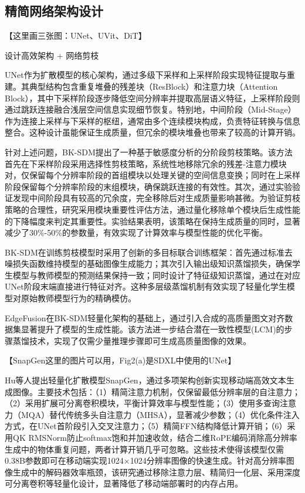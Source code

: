\documentclass[11pt,a4paper,UTF8]{ctexart}
\begin{document}
\subsection{精简网络架构设计}

【这里画三张图：UNet、UVit、DiT】

设计高效架构 + 网络剪枝\cite{li2023snapfusion,kim2023architectural,zhao2024mobilediffusion}

UNet作为扩散模型的核心架构，通过多级下采样和上采样阶段实现特征提取与重建。其典型结构包含重复堆叠的残差块（ResBlock）和注意力块（Attention Block），其中下采样阶段逐步降低空间分辨率并提取高层语义特征，上采样阶段则通过跳跃连接融合浅层空间信息实现细节恢复。特别地，中间阶段（Mid-Stage）作为连接上采样与下采样的枢纽，通常由多个连续模块构成，负责特征转换与信息整合。这种设计虽能保证生成质量，但冗余的模块堆叠也带来了较高的计算开销。

针对上述问题，BK-SDM\cite{kim2023bk}提出了一种基于敏感度分析的分阶段剪枝策略。该方法首先在下采样阶段采用选择性剪枝策略，系统性地移除冗余的残差-注意力模块对，仅保留每个分辨率阶段的首组模块以处理关键的空间信息变换；同时在上采样阶段保留每个分辨率阶段的末组模块，确保跳跃连接的有效性。其次，通过实验验证发现中间阶段具有较高的冗余度，完全移除后对生成质量影响甚微。为验证剪枝策略的合理性，研究采用模块重要性评估方法，通过量化移除单个模块后生成性能的下降幅度来判定其重要性。实验结果表明，该策略在保持生成质量的同时，显著减少了30\%-50\%的参数量，有效实现了计算效率与模型性能的优化平衡。

BK-SDM\cite{kim2023bk}在训练剪枝模型时采用了创新的多目标联合训练框架：首先通过标准去噪损失函数维持模型的基础图像生成能力；其次引入输出级知识蒸馏损失，确保学生模型与教师模型的预测结果保持一致；同时设计了特征级知识蒸馏，通过在对应UNet阶段末端直接进行特征对齐。这种多层级蒸馏机制有效实现了轻量化学生模型对原始教师模型行为的精确模仿。

EdgeFusion\cite{castells2024edgefusion}在BK-SDM轻量化架构的基础上，通过引入合成的高质量图文对齐数据集显著提升了模型的生成性能。该方法进一步结合潜在一致性模型(LCM)的步骤蒸馏技术，实现了仅需少量推理步骤即可生成高质量图像的效果。

【SnapGen这里的图片可以用，Fig2(a)是SDXL中使用的UNet】

Hu等人\cite{hu2024snapgen}提出轻量化扩散模型SnapGen，通过多项架构创新实现移动端高效文本生成图像。主要技术包括：（1）精简注意力机制，仅保留最低分辨率层的自注意力；（2）采用扩展可分离卷积\cite{howard2017mobilenets}模块，平衡计算效率与模型性能；（3）使用多查询注意力（MQA）\cite{shazeer2019fast}替代传统多头自注意力（MHSA），显著减少参数；（4）优化条件注入方式，在UNet首阶段引入交叉注意力；（5）精简FFN结构降低计算开销；（6）采用QK RMSNorm\cite{henry2020query,zhang2019root}防止softmax饱和并加速收敛，结合二维RoPE编码\cite{su2024roformer}消除高分辨率生成中的物体重复问题，两者计算开销几乎可忽略。这些技术使得该模型仅需0.38B参数即可在移动端实现1024×1024分辨率图像的快速生成。针对高分辨率图像生成中的解码器效率瓶颈，该研究通过移除注意力层、精简归一化层、采用深度可分离卷积等轻量化设计，显著降低了移动端部署时的内存占用。
\end{document}
